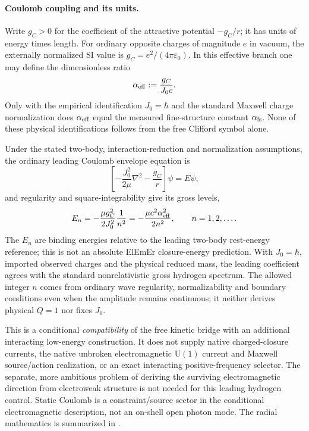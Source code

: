 \documentclass[11pt]{article}
\theoremstyle{definition}
\begin{document}
\paragraph{Coulomb coupling and its units.}
Write $g_C>0$ for the coefficient of the attractive potential $-g_C/r$; it has
units of energy times length.  For ordinary opposite charges of magnitude $e$ in
vacuum, the externally normalized SI value is
$g_C=e^2/(4\pi\varepsilon_0)$.  In this effective branch one may define the
dimensionless ratio
\begin{equation}
 \alpha_{\rm eff}:=\frac{g_C}{J_0c}.
 \label{eq:alphaeff}
\end{equation}
Only with the empirical identification $J_0=\hbar$ and the standard Maxwell
charge normalization does $\alpha_{\rm eff}$ equal the measured
fine-structure constant $\alpha_{\rm fs}$.  None of these physical identifications
follows from the free Clifford symbol alone.

Under the stated two-body, interaction-reduction and normalization assumptions,
the ordinary leading Coulomb envelope equation is
\begin{equation}
 \left[-\frac{J_0^2}{2\mu}\nabla^2-\frac{g_C}{r}\right]\psi=E\psi,
 \label{eq:hydrogenJ}
\end{equation}
and regularity and square-integrability give its gross levels,
\begin{equation}
 E_n=-\frac{\mu g_C^2}{2J_0^2}\frac{1}{n^2}
     =-\frac{\mu c^2\alpha_{\rm eff}^2}{2n^2},
 \qquad n=1,2,\ldots.
 \label{eq:hydrogenlevelsJ}
\end{equation}
The $E_n$ are binding energies relative to the leading two-body rest-energy
reference; this is not an absolute ElEmEr closure-energy prediction.
With $J_0=\hbar$, imported observed charges and the physical reduced mass,
the leading coefficient agrees with the standard nonrelativistic gross
hydrogen spectrum.  The allowed integer $n$ comes from ordinary wave
regularity, normalizability and boundary conditions even when the amplitude
remains continuous; it neither derives physical $Q=1$ nor fixes $J_0$.

This is a conditional \emph{compatibility} of the free kinetic
bridge with an additional interacting low-energy construction.  It does not
supply native charged-closure currents, the native unbroken electromagnetic $\mathrm U(1)$ current and
Maxwell source/action realization, or an exact
interacting positive-frequency selector. The separate, more ambitious problem
of deriving the surviving electromagnetic direction from electroweak structure
is not needed for this leading hydrogen control.  Static Coulomb is a
constraint/source sector in the conditional electromagnetic description, not
an on-shell open photon mode.  The radial mathematics is
summarized in .
\end{document}
